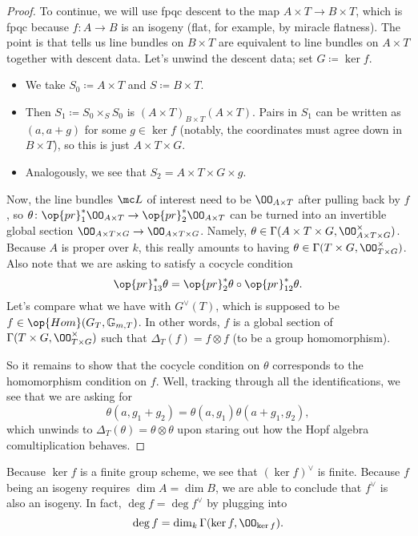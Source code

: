 \documentclass[../notes.tex]{subfiles}
\begin{document}
\begin{proof}
	To continue, we will use fpqc descent to the map $A\times T\to B\times T$, which is fpqc because $f\colon A\to B$ is an isogeny (flat, for example, by miracle flatness). The point is that  tells us line bundles on $B\times T$ are equivalent to line bundles on $A\times T$ together with descent data. Let's unwind the descent data; set $G\coloneqq\ker f$.
	\begin{itemize}
		\item We take $S_0\coloneqq A\times T$ and $S\coloneqq B\times T$.
		\item Then $S_1\coloneqq S_0\times_SS_0$ is $(A\times T)_{B\times T}(A\times T)$. Pairs in $S_1$ can be written as $(a,a+g)$ for some $g\in\ker f$ (notably, the coordinates must agree down in $B\times T$), so this is just $A\times T\times G$.
		\item Analogously, we see that $S_2=A\times T\times G\times g$.
	\end{itemize}
	Now, the line bundles $\mc L$ of interest need to be $\OO_{A\times T}$ after pulling back by $f$, so $\theta\colon\op{pr}_1^*\OO_{A\times T}\to\op{pr}_2^*\OO_{A\times T}$ can be turned into an invertible global section $\OO_{A\times T\times G}\to\OO_{A\times T\times G}$. Namely, $\theta\in\Gamma(A\times T\times G,\OO_{A\times T\times G}^\times)$. Because $A$ is proper over $k$, this really amounts to having $\theta\in\Gamma(T\times G,\OO_{T\times G}^\times)$. Also note that we are asking to satisfy a cocycle condition
	\[\op{pr}_{13}^*\theta=\op{pr}_2^*\theta\circ\op{pr}_{12}^*\theta.\]
	Let's compare what we have with $G^\lor(T)$, which is supposed to be $f\in\op{Hom}(G_T,\mathbb G_{m,T})$. In other words, $f$ is a global section of $\Gamma(T\times G,\OO_{T\times G}^\times)$ such that $\Delta_T(f)=f\otimes f$ (to be a group homomorphism).

	So it remains to show that the cocycle condition on $\theta$ corresponds to the homomorphism condition on $f$. Well, tracking through all the identifications, we see that we are asking for
	\[\theta(a,g_1+g_2)=\theta(a,g_1)\theta(a+g_1,g_2),\]
	which unwinds to $\Delta_T(\theta)=\theta\otimes\theta$ upon staring out how the Hopf algebra comultiplication behaves.
\end{proof}
\begin{remark}
	Because $\ker f$ is a finite group scheme, we see that $(\ker f)^\lor$ is finite. Because $f$ being an isogeny requires $\dim A=\dim B$, we are able to conclude that $f^\lor$ is also an isogeny. In fact, $\deg f=\deg f^\lor$ by plugging  into
	\[\deg f=\dim_k\Gamma(\ker f,\OO_{\ker f}).\]
\end{remark}
\end{document}
